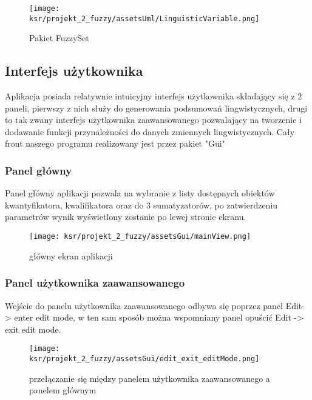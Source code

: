 \documentclass{article}
\begin{document}
\begin{figure}[H]
\centering
\texttt{[image: ksr/projekt\_2\_fuzzy/assetsUml/LinguisticVariable.png]}
\caption{Pakiet FuzzySet}
\label{fig:epsilon_bat}
\end{figure}

\subsection{Interfejs użytkownika}

\noindent Aplikacja posiada relatywnie intuicyjny interfejs użytkownika składający się z 2 paneli, pierwszy z nich służy do generowania podsumowań lingwistycznych, drugi to tak zwany interfejs użytkownika zaawansowanego pozwalający na tworzenie i dodawanie funkcji przynależności do danych zmiennych lingwistycznych. Cały front naszego programu realizowany jest przez pakiet "Gui" \\

\subsubsection{Panel główny}

\noindent Panel główny aplikacji pozwala na wybranie z listy dostępnych obiektów kwantyfikatora, kwalifikatora oraz do 3 sumatyzatorów, po zatwierdzeniu parametrów wynik wyświetlony zostanie po lewej stronie ekranu.

\begin{figure}[H]
\centering
\texttt{[image: ksr/projekt\_2\_fuzzy/assetsGui/mainView.png]}
\caption{główny ekran aplikacji}
\label{fig:epsilon_bat}
\end{figure}

\subsubsection{Panel użytkownika zaawansowanego}

\noindent Wejście do panelu użytkownika zaawansowanego odbywa się poprzez panel Edit-> enter edit mode, w ten sam sposób można wspomniany panel opuścić Edit -> exit edit mode.

\begin{figure}[H]
\centering
\texttt{[image: ksr/projekt\_2\_fuzzy/assetsGui/edit\_exit\_editMode.png]}
\caption{przełączanie się między panelem użytkownika zaawansowanego a panelem głównym}
\label{fig:epsilon_bat}
\end{figure}
\end{document}
